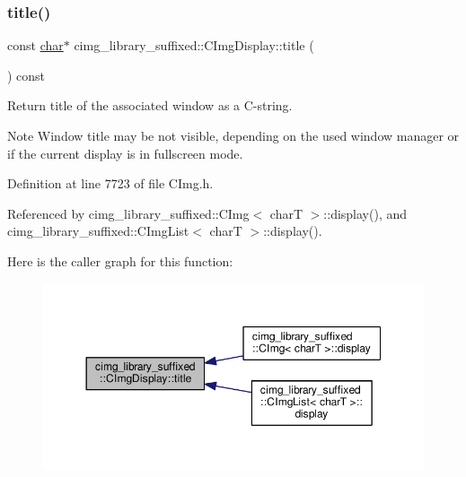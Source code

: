 \mbox{\label{structcimg__library__suffixed_1_1CImgDisplay_aec4c62a5a049354df77d22f6fe91e95c}} 
\subsubsection{\texorpdfstring{title()}{title()}}
{\footnotesize\ttfamily const \hyperlink{classchar}{char}$\ast$ cimg\+\_\+library\+\_\+suffixed\+::\+C\+Img\+Display\+::title (\begin{DoxyParamCaption}{ }\end{DoxyParamCaption}) const\hspace{0.3cm}{\ttfamily [inline]}}



Return title of the associated window as a C-\/string. 

\begin{DoxyNote}{Note}
Window title may be not visible, depending on the used window manager or if the current display is in fullscreen mode. 
\end{DoxyNote}


Definition at line 7723 of file C\+Img.\+h.



Referenced by cimg\+\_\+library\+\_\+suffixed\+::\+C\+Img$<$ char\+T $>$\+::display(), and cimg\+\_\+library\+\_\+suffixed\+::\+C\+Img\+List$<$ char\+T $>$\+::display().

Here is the caller graph for this function\+:
\nopagebreak
\begin{figure}[H]
\begin{center}
\leavevmode
\includegraphics[width=350pt]{d5/d53/structcimg__library__suffixed_1_1CImgDisplay_aec4c62a5a049354df77d22f6fe91e95c_icgraph}
\end{center}
\end{figure}
\mbox{\label{structcimg__library__suffixed_1_1CImgDisplay_a1f98bd17638afff76af6bb94af98b73a}} 
